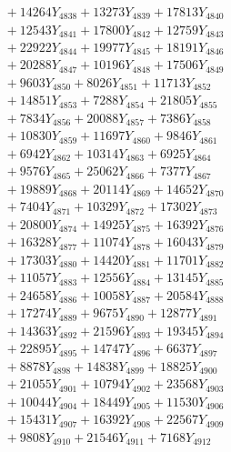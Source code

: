 \documentclass[a4paper,10pt]{article}
\begin{document}
{\begin{align}
&\;  + 14264 Y_{4838} + 13273 Y_{4839} + 17813 Y_{4840} \\[0.3ex]
&\;  + 12543 Y_{4841} + 17800 Y_{4842} + 12759 Y_{4843} \\[0.3ex]
&\;  + 22922 Y_{4844} + 19977 Y_{4845} + 18191 Y_{4846} \\[0.3ex]
&\;  + 20288 Y_{4847} + 10196 Y_{4848} + 17506 Y_{4849} \\[0.3ex]
&\;  + 9603 Y_{4850} + 8026 Y_{4851} + 11713 Y_{4852} \\[0.3ex]
&\;  + 14851 Y_{4853} + 7288 Y_{4854} + 21805 Y_{4855} \\[0.3ex]
&\;  + 7834 Y_{4856} + 20088 Y_{4857} + 7386 Y_{4858} \\[0.5ex]\allowbreak
&\;  + 10830 Y_{4859} + 11697 Y_{4860} + 9846 Y_{4861} \\[0.3ex]
&\;  + 6942 Y_{4862} + 10314 Y_{4863} + 6925 Y_{4864} \\[0.3ex]
&\;  + 9576 Y_{4865} + 25062 Y_{4866} + 7377 Y_{4867} \\[0.3ex]
&\;  + 19889 Y_{4868} + 20114 Y_{4869} + 14652 Y_{4870} \\[0.3ex]
&\;  + 7404 Y_{4871} + 10329 Y_{4872} + 17302 Y_{4873} \\[0.3ex]
&\;  + 20800 Y_{4874} + 14925 Y_{4875} + 16392 Y_{4876} \\[0.3ex]
&\;  + 16328 Y_{4877} + 11074 Y_{4878} + 16043 Y_{4879} \\[0.3ex]
&\;  + 17303 Y_{4880} + 14420 Y_{4881} + 11701 Y_{4882} \\[0.3ex]
&\;  + 11057 Y_{4883} + 12556 Y_{4884} + 13145 Y_{4885} \\[0.3ex]
&\;  + 24658 Y_{4886} + 10058 Y_{4887} + 20584 Y_{4888} \\[0.5ex]\allowbreak
&\;  + 17274 Y_{4889} + 9675 Y_{4890} + 12877 Y_{4891} \\[0.3ex]
&\;  + 14363 Y_{4892} + 21596 Y_{4893} + 19345 Y_{4894} \\[0.3ex]
&\;  + 22895 Y_{4895} + 14747 Y_{4896} + 6637 Y_{4897} \\[0.3ex]
&\;  + 8878 Y_{4898} + 14838 Y_{4899} + 18825 Y_{4900} \\[0.3ex]
&\;  + 21055 Y_{4901} + 10794 Y_{4902} + 23568 Y_{4903} \\[0.3ex]
&\;  + 10044 Y_{4904} + 18449 Y_{4905} + 11530 Y_{4906} \\[0.3ex]
&\;  + 15431 Y_{4907} + 16392 Y_{4908} + 22567 Y_{4909} \\[0.3ex]
&\;  + 9808 Y_{4910} + 21546 Y_{4911} + 7168 Y_{4912} \\[0.3ex]

\end{align}}
\end{document}
